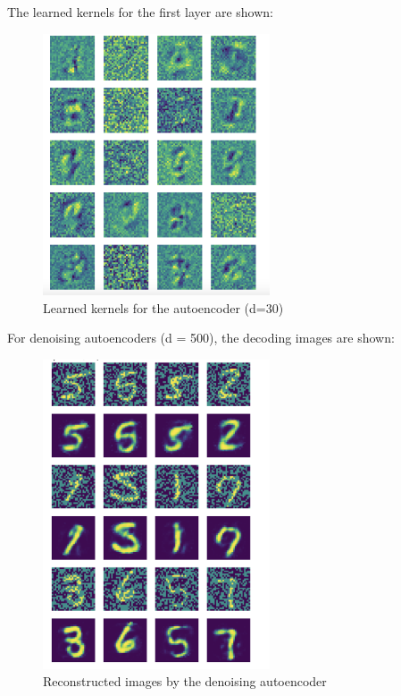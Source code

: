The learned kernels for the first layer are shown:

\begin{figure}[htb]
    \centering
    \includegraphics[width=0.6\textwidth]{figs/AE_kernels.png}
    \caption{Learned kernels for the autoencoder (d=30)}
    \label{fig:AE kernels}
\end{figure}

For denoising autoencoders (d = 500), the decoding images are shown:

\begin{figure}[H]
    \centering
    \includegraphics[width=0.6\textwidth]{figs/Denoising_AE.png}
    \caption{Reconstructed images by the denoising autoencoder}
    \label{fig:Denosing Autoencoder}
\end{figure}

